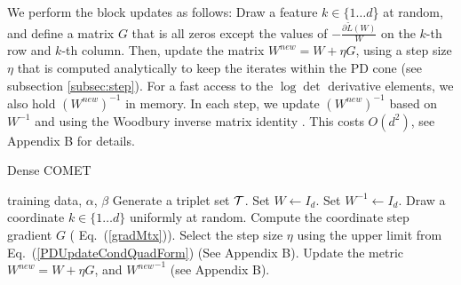 \documentclass[twoside,11pt]{article}
\newcommand\mat[1]{{#1}}
\newcommand{\T}{{}^\mathsf{T}}
\newcommand{\W}{\mat{W}}
\newcommand{\newW}{{\mat{W^{new}}}}
\newcommand{\tL}{\tilde{L}(\W)}
\newcommand{\cholL}{\mat{L}}
\newcommand{\grd}{\frac{\partial \tL}{\W}}
\renewcommand{\eqref}[1]{Eq.~(\ref{#1})}
\begin{document}
We perform the block updates as follows: %
Draw a feature $k \in \{1 \ldots d$\} at random, and define a matrix $\mat{G}$ that is all zeros except the values of $-\grd$ on the $k$-th row and $k$-th column. Then, update the matrix $\newW = \W +\eta \mat{G}$, using a step size $\eta$ that is computed analytically to keep the iterates within the PD cone (see subsection \ref{subsec:step}).
For a fast access to the $\log\det$ derivative elements, we also hold $(\newW)^{-1}$ in memory. In each step, we update $(\newW)^{-1}$ based on $\W^{-1}$ and using the Woodbury inverse matrix identity \citep{woodbury1950inverting}. This costs $O(d^2)$, see Appendix B for details.

\begin{algorithm}[th]
   \caption{Dense COMET}
   \label{alg:comet}
\begin{algorithmic}[1]
    training data, $\alpha$, $\beta$
   Generate a triplet set $\cal{T}$. Set  $\W  \leftarrow I_d$. Set $\W^{-1}  \leftarrow I_d$. %
   \REPEAT 
   \STATE Draw a coordinate $k \in \{1 \ldots d\}$ uniformly at random. 
   \STATE Compute the coordinate step gradient $\mat{G}$ ( \eqref{gradMtx}).
   \STATE Select the step size $\eta$ using the upper limit from \eqref{PDUpdateCondQuadForm} (See Appendix B).
   \STATE Update the metric $\newW=\W+\eta G$, and $\newW^{-1}$ (see Appendix B).
\end{algorithmic}
\vskip -5pt
\end{algorithm}

\vspace{-6pt}
\end{document}
